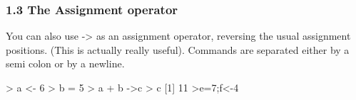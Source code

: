 \documentclass{beamer}
\begin{document}
 	\begin{frame}[fragile]
 		\frametitle{1.3 The Assignment operator}
 		
 		You can also use -> as an assignment operator, reversing the
 		usual assignment positions. (This is actually really useful). Commands are separated either by
 		a semi colon or by a newline.
 		\begin{framed}
 			\begin{semiverbatim}
 				> a <- 6
 				> b = 5
 				> a + b ->c
 				> c
 				[1] 11
 				>e=7;f<-4
 			\end{semiverbatim}
 		\end{framed}
 	\end{frame}
 
\end{document}
